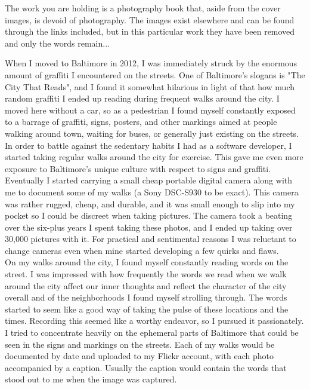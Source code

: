 \documentclass[10pt,letterpaper]{article}
\title{}
\author{}
\date{}
\begin{document}
\vspace*{4in}
The work you are holding is a photography book that, aside from the cover images, is devoid of photography.  The images exist elsewhere and can be found through the links included, but in this particular work they have been removed and only the words remain...


\pagebreak

\mbox{}

\pagebreak


When I moved to Baltimore in 2012, I was immediately struck by the enormous amount of graffiti I encountered on the streets.  One of Baltimore's slogans is "The City That Reads", and I found it somewhat hilarious in light of that how much random graffiti I ended up reading during frequent walks around the city.  I moved here without a car, so as a pedestrian I found myself constantly exposed to a barrage of graffiti, signs, posters, and other markings aimed at people walking around town, waiting for buses, or generally just existing on the streets.\\


In order to battle against the sedentary habits I had as a software developer, I started taking regular walks around the city for exercise.  This gave me even more exposure to Baltimore's unique culture with respect to signs and graffiti.\\


Eventually I started carrying a small cheap portable digital camera along with me to document some of my walks (a Sony DSC-S930 to be exact).  This camera was rather rugged, cheap, and durable, and it was small enough to slip into my pocket so I could be discreet when taking pictures.  The camera took a beating over the six-plus years I spent taking these photos, and I ended up taking over 30,000 pictures with it.  For practical and sentimental reasons I was reluctant to change cameras even when mine started developing a few quirks and flaws.\\


On my walks around the city, I found myself constantly reading words on the street.  I was impressed with how frequently the words we read when we walk around the city affect our inner thoughts and reflect the character of the city overall and of the neighborhoods I found myself strolling through.  The words started to seem like a good way of taking the pulse of these locations and the times.  Recording this seemed like a worthy endeavor, so I pursued it passionately.  I tried to concentrate heavily on the ephemeral parts of Baltimore that could be seen in the signs and markings on the streets.  Each of my walks would be documented by date and uploaded to my Flickr account, with each photo accompanied by a caption.  Usually the caption would contain the words that stood out to me when the image was captured.\\
\end{document}

